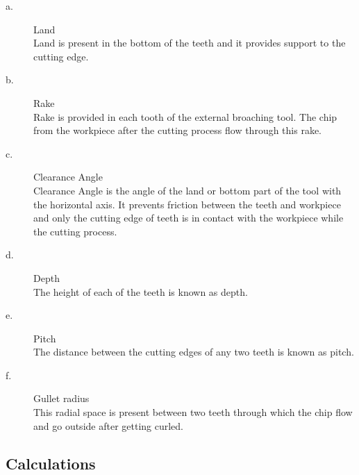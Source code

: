 \documentclass[16pt,a4paper]{article}
\begin{document}
\begin{description}

\item [a.] Land \\    
Land is present in the bottom of the teeth and it provides support to the cutting edge.
\item [b.] Rake \\   
Rake is provided in each tooth of the external broaching tool. The chip from the workpiece after the cutting process flow through this rake.
\item [c.] Clearance Angle \\  
Clearance Angle is the angle of the land or bottom part of the tool with the horizontal axis. It prevents friction between the teeth and workpiece and only the cutting edge of teeth is in contact with the workpiece while the cutting process.
\item [d.] Depth \\  
The height of each of the teeth is known as depth.
\item [e.] Pitch \\   
The distance between the cutting edges of any two teeth is known as pitch.
\item [f.] Gullet radius \\   
This radial space is present between two teeth through which the chip flow and go outside after getting curled.

\end{description}

\subsection{Calculations}
\end{document}
